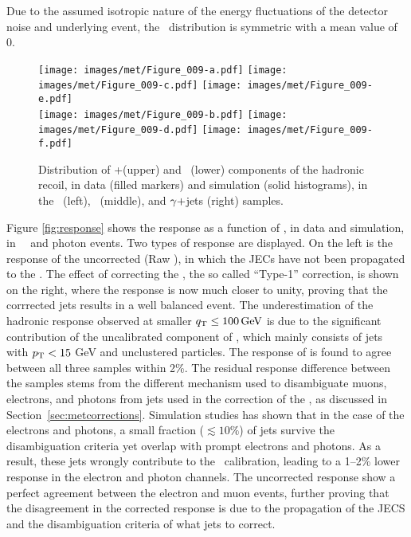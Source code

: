 Due to the assumed isotropic nature of the energy fluctuations of the detector noise and underlying event, the \uperp\ distribution is symmetric with a mean value of 0. 
\begin{figure}[!htb]
  \centering
  \texttt{[image: images/met/Figure\_009-a.pdf]}
  \texttt{[image: images/met/Figure\_009-c.pdf]}
  \texttt{[image: images/met/Figure\_009-e.pdf]}\\
  \texttt{[image: images/met/Figure\_009-b.pdf]}
  \texttt{[image: images/met/Figure\_009-d.pdf]}
  \texttt{[image: images/met/Figure\_009-f.pdf]}
  \caption{Distribution of \upar+\qt (upper) and \uperp\ (lower) components of the hadronic recoil, in data (filled markers) and simulation (solid histograms), in the  \Zmm\ (left), \Zee\ (middle), and $\gamma+$jets (right) samples.} 
  \label{fig:uparuperp}
\end{figure}
Figure \ref{fig:response} shows the \ptmiss response as a function of \qt, in data and simulation, in \Zmm\, \Zee\, and photon events. 
Two types of response are displayed. 
On the left is the response of the uncorrected \ptmiss (Raw \ptmiss), in which the JECs have not been propagated to the \ptmiss. 
The effect of correcting the \ptmiss, the so called ``Type-1'' correction, is shown on the right, where the response is now much closer to unity, proving that the corrrected jets results in a well balanced event. 
The underestimation of the hadronic response observed at smaller ${q}_{\mathrm T} \leq 100\,\text{Ge\hspace{-.08em}V}$ is due to the significant contribution of the uncalibrated component of \ptmiss, which mainly consists of jets with $p_{\mathrm{T}} < 15$ GeV and unclustered particles. 
The response of \ptmiss is found to agree between all three samples within 2\%. 
The residual response difference between the samples stems from the different mechanism used to disambiguate muons, electrons, and photons from jets used in the correction of the \ptmiss, as discussed in Section~\ref{sec:metcorrections}. 
Simulation studies has shown that in the case of the electrons and photons, a small fraction ($\lesssim 10\%$) of jets survive the disambiguation criteria yet overlap with prompt electrons and photons. 
As a result, these jets wrongly contribute to the \ptmiss\ calibration, leading to a 1--2\% lower response in the electron and photon channels. 
The uncorrected \ptmiss response show a perfect agreement between the electron and muon events, further proving that the disagreement in the corrected response is due to the propagation of the JECS and the disambiguation criteria of what jets to correct.
